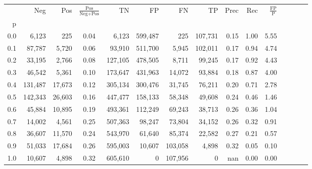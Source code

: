 \begin{tabular}{rrrcrrrrrrrrrrr}
\toprule
{} &      Neg &     Pos & $\frac{\text{Pos}}{\text{Neg}+\text{Pos}}$ &       TN &       FP &       FN &       TP &  Prec &   Rec & $\frac{\text{FP}}{\text{P}}$ \\
p   &          &         &                                            &          &          &          &          &       &       &                              \\
\midrule
0.0 &    6,123 &     225 &                                       0.04 &    6,123 &  599,487 &      225 &  107,731 &  0.15 &  1.00 &                         5.55 \\
0.1 &   87,787 &   5,720 &                                       0.06 &   93,910 &  511,700 &    5,945 &  102,011 &  0.17 &  0.94 &                         4.74 \\
0.2 &   33,195 &   2,766 &                                       0.08 &  127,105 &  478,505 &    8,711 &   99,245 &  0.17 &  0.92 &                         4.43 \\
0.3 &   46,542 &   5,361 &                                       0.10 &  173,647 &  431,963 &   14,072 &   93,884 &  0.18 &  0.87 &                         4.00 \\
0.4 &  131,487 &  17,673 &                                       0.12 &  305,134 &  300,476 &   31,745 &   76,211 &  0.20 &  0.71 &                         2.78 \\
0.5 &  142,343 &  26,603 &                                       0.16 &  447,477 &  158,133 &   58,348 &   49,608 &  0.24 &  0.46 &                         1.46 \\
0.6 &   45,884 &  10,895 &                                       0.19 &  493,361 &  112,249 &   69,243 &   38,713 &  0.26 &  0.36 &                         1.04 \\
0.7 &   14,002 &   4,561 &                                       0.25 &  507,363 &   98,247 &   73,804 &   34,152 &  0.26 &  0.32 &                         0.91 \\
0.8 &   36,607 &  11,570 &                                       0.24 &  543,970 &   61,640 &   85,374 &   22,582 &  0.27 &  0.21 &                         0.57 \\
0.9 &   51,033 &  17,684 &                                       0.26 &  595,003 &   10,607 &  103,058 &    4,898 &  0.32 &  0.05 &                         0.10 \\
1.0 &   10,607 &   4,898 &                                       0.32 &  605,610 &        0 &  107,956 &        0 &   nan &  0.00 &                         0.00 \\
\bottomrule
\end{tabular}
